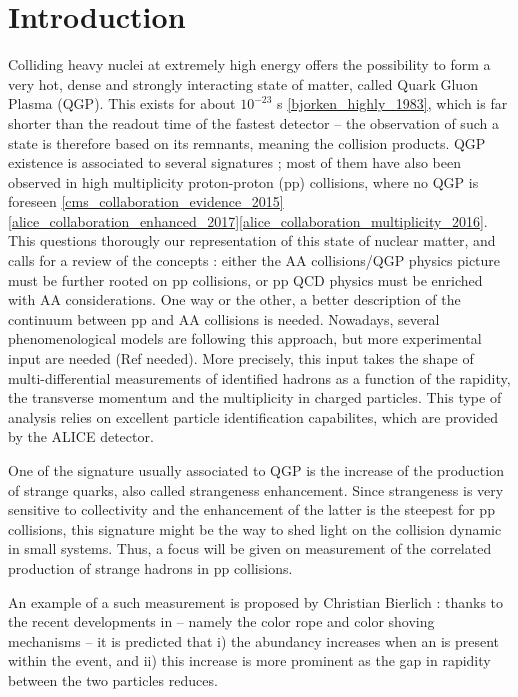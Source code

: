 \newpage


\section{Introduction}
\label{sec:Section01-Intro}

Colliding heavy nuclei at extremely high energy offers the possibility to form a very hot, dense and strongly interacting state of matter, called Quark Gluon Plasma (QGP). This exists for about $10^{-23}$ s \ref{bjorken_highly_1983}, which is far shorter than the readout time of the fastest detector -- the observation of such a state is therefore based on its remnants, meaning the collision products. QGP existence is associated to several signatures ; most of them have also been observed in high multiplicity proton-proton (pp) collisions, where no QGP is foreseen \ref{cms_collaboration_evidence_2015}\ref{alice_collaboration_enhanced_2017}\ref{alice_collaboration_multiplicity_2016}. This questions thorougly our representation of this state of nuclear matter, and calls for a review of the concepts : either the AA collisions/QGP physics picture must be further rooted on pp collisions, or pp QCD physics must be enriched with AA considerations. One way or the other, a better description of the continuum between pp and AA collisions is needed. Nowadays, several phenomenological models are following this approach, but more experimental input are needed (Ref needed). More precisely, this input takes the shape of multi-differential measurements of identified hadrons as a function of the rapidity, the transverse momentum and the multiplicity in charged particles. This type of analysis relies on excellent particle identification capabilites, which are provided by the ALICE detector.

One of the signature usually associated to QGP is the increase of the production of strange quarks, also called strangeness enhancement. Since strangeness is very sensitive to collectivity and the enhancement of the latter is the steepest for pp collisions, this signature might be the way to shed light on the collision dynamic in small systems. Thus, a focus will be given on measurement of the correlated production of strange hadrons in pp collisions. 

An example of a such measurement is proposed by Christian Bierlich : thanks to the recent developments in \Pythiaeight -- namely the color rope and color shoving mechanisms -- it is predicted that i) the \rmOmegaM [$sss$] abundancy increases when an \rmPhiMes [$s \bar{s}$] is present within the event, and ii) this increase is more prominent as the gap in rapidity between the two particles reduces. 

